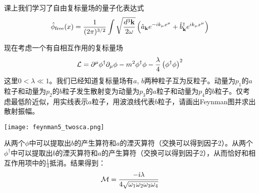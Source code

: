 \documentclass[CJK]{beamer}
\begin{document}
\begin{frame}
\bch
{\small
课上我们学习了自由复标量场的量子化表达式
$${\hat{\phi}}_{\rm free}(x) = \frac{1}{(2\pi)^{3/2}} \int \sqrt{\frac{d^3{\mathbf{k}}}{2\omega}} \left({\hat{a}}_{{\mathbf{k}}} e^{-ik_\mu x^\mu} + {\hat{b}^\dagger}_{{\mathbf{k}}}e^{ik_\mu x^\mu}\right) $$

现在考虑一个有自相互作用的复标量场
$$ {\mathcal{L}} = \partial^\mu\phi^\dagger \partial_\mu \phi - m^2\phi^\dagger\phi - \frac{\lambda}{4}\left(\phi^\dagger\phi\right)^2$$
这里$0<\lambda\ll 1$。我们已经知道复标量场有$a$, $b$两种粒子互为反粒子。动量为$p_1$的$a$粒子和动量为$p_2$的$b$粒子发生散射变为动量为$p_3$的$a$粒子和动量为$p_4$的$b$粒子。仅考虑最低阶近似，用实线表示$a$粒子，用波浪线代表$b$粒子，请画出Feynman图并求出散射振幅。

}
\ech
\end{frame}


\begin{frame}
\bch
\texttt{[image: feynman5\_twosca.png]}

从两个$\phi$中可以提取出$b$的产生算符和$a$的湮灭算符（交换可以得到因子2）。从两个$\phi^\dagger$中可以提取出$b$的湮灭算符和$a$的产生算符（交换可以得到因子2），从而恰好和相互作用项中的$\frac{1}{4}$抵消。结果得到：
$${\mathcal{M}}  = \frac{-{\dot{\imath}} \lambda}{4\sqrt{\omega_1\omega_2\omega_3\omega_4}}$$
\ech
\end{frame}
\end{document}
